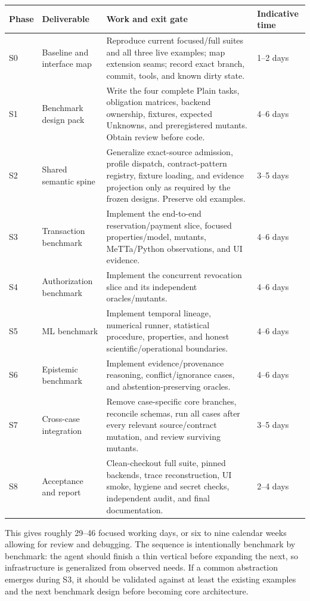 \documentclass[11pt]{article}
\begin{document}
\begin{longtable}{@{}p{}p{}p{}p{}@{}}
\toprule
Phase & Deliverable & Work and exit gate & Indicative time \\
\midrule
\endhead
S0 & Baseline and interface map & Reproduce current focused/full suites and all three live examples; map extension seams; record exact branch, commit, tools, and known dirty state. & 1--2 days \\
S1 & Benchmark design pack & Write the four complete Plain tasks, obligation matrices, backend ownership, fixtures, expected Unknowns, and preregistered mutants.  Obtain review before code. & 4--6 days \\
S2 & Shared semantic spine & Generalize exact-source admission, profile dispatch, contract-pattern registry, fixture loading, and evidence projection only as required by the frozen designs.  Preserve old examples. & 3--5 days \\
S3 & Transaction benchmark & Implement the end-to-end reservation/payment slice, focused properties/model, mutants, MeTTa/Python observations, and UI evidence. & 4--6 days \\
S4 & Authorization benchmark & Implement the concurrent revocation slice and its independent oracles/mutants. & 4--6 days \\
S5 & ML benchmark & Implement temporal lineage, numerical runner, statistical procedure, properties, and honest scientific/operational boundaries. & 4--6 days \\
S6 & Epistemic benchmark & Implement evidence/provenance reasoning, conflict/ignorance cases, and abstention-preserving oracles. & 4--6 days \\
S7 & Cross-case integration & Remove case-specific core branches, reconcile schemas, run all cases after every relevant source/contract mutation, and review surviving mutants. & 3--5 days \\
S8 & Acceptance and report & Clean-checkout full suite, pinned backends, trace reconstruction, UI smoke, hygiene and secret checks, independent audit, and final documentation. & 2--4 days \\
\bottomrule
\end{longtable}

This gives roughly 29--46 focused working days, or six to nine calendar weeks
allowing for review and debugging.  The sequence is intentionally benchmark by
benchmark: the agent should finish a thin vertical before expanding the next,
so infrastructure is generalized from observed needs.  If a common abstraction
emerges during S3, it should be validated against at least the existing examples
and the next benchmark design before becoming core architecture.
\end{document}
